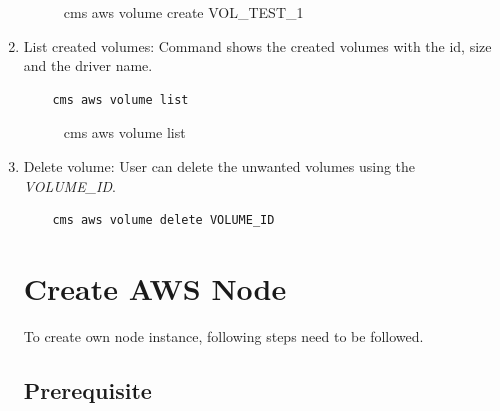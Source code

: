 \documentclass[9pt,twocolumn,twoside]{../../styles/osajnl}
\begin{document}
\begin{enumerate}
    \begin{figure}[h!]
    	\centering
    	\caption{cms aws volume create VOL\_TEST\_1}
    	\label{fig:createvolume}
    \end{figure}
     
    \item List created volumes: Command shows the created volumes with the id, size and the driver name.
    
    \begin{verbatim}
    cms aws volume list
    \end{verbatim}
    
    \begin{figure}[h!]
    	\centering
    	\caption{cms aws volume list}
    	\label{fig:volumelist}
    \end{figure}
    
    \item Delete volume: User can delete the unwanted volumes using the \textit{VOLUME\_ID}.
    
    \begin{verbatim}
    cms aws volume delete VOLUME_ID
    \end{verbatim}
    
    
\section{Create AWS Node}
	To create own node instance, following steps need to be followed. 

\subsection{Prerequisite}


\end{enumerate}
\end{document}

